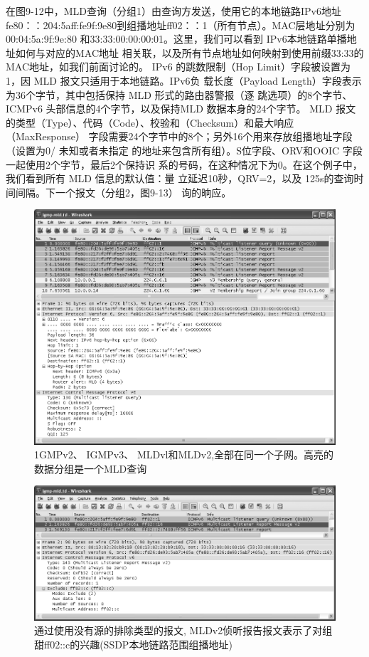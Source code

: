 在图9-12中，MLD查询（分组1）由查询方发送，使用它的本地链路IPv6地址
fe80：：204:5aff:fe9f:9e80到组播地址ff02：：1（所有节点）。MAC层地址分别为00:04:5a:9f:9e:80
和33:33:00:00:00:01。这里，我们可以看到 IPv6本地链路单播地址如何与对应的MAC地址
相关联，以及所有节点地址如何映射到使用前缀33:33的MAC地址，如我们前面讨论的。
IPv6 的跳数限制（Hop Limit）字段被设置为1，因 MLD 报文只适用于本地链路。IPv6负
载长度（Payload Length）字段表示为36个字节，其中包括保持 MLD 形式的路由器警报（逐
跳选项）的8个字节、ICMPv6 头部信息的4个字节，以及保持MLD 数据本身的24个字节。
MLD 报文的类型（Type）、代码（Code）、校验和（Checksum）和最大响应（MaxResponse）
字段需要24个字节中的8个；另外16个用来存放组播地址字段（设置为0/ 未知或者未指定
的地址来包含所有组）。S位字段、ORV和OOIC 字段一起使用2个字节，最后2个保持识
系的号码，在这种情况下为0。在这个例子中，我们看到所有 MLD 信息的默认值：量
立延迟10秒，QRV=2，以及 125s的查询时间间隔。下一个报文（分组2，图9-13）
询的晌应。

\begin{figure}[ht]
  \centering
  \includegraphics[width=1.0\textwidth]{imgs/9/9-12.png}
  \caption{1GMPv2、 IGMPv3、 MLDvl和MLDv2,全部在同一个子网。高亮的数据分组是一个MLD查询}
\end{figure}

\begin{figure}[ht]
  \centering
  \includegraphics[width=1.0\textwidth]{imgs/9/9-13.png}
  \caption{通过使用没有源的排除类型的报文, MLDv2侦听报告报文表示了对组甜ff02::c的兴趣(SSDP本地链路范围组播地址)}
\end{figure}

